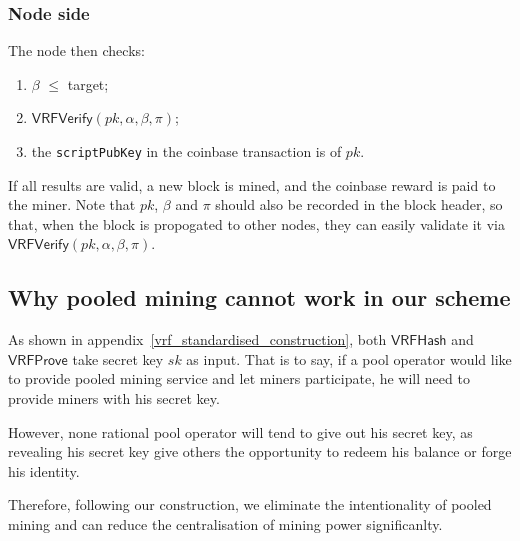 \subsubsection{Node side}

The node then checks:

\begin{enumerate}
    \item $\beta$ $\le$ target;
    \item $\mathsf{VRFVerify}(pk, \alpha, \beta, \pi)$;
    \item the \texttt{scriptPubKey} in the coinbase transaction is of $pk$.
\end{enumerate}

If all results are valid, a new block is mined, and the coinbase reward is paid to the miner. Note that $pk$, $\beta$ and $\pi$ should also be recorded in the block header, so that, when the block is propogated to other nodes, they can easily validate it via $\mathsf{VRFVerify}(pk, \alpha, \beta, \pi)$.



\subsection{Why pooled mining cannot work in our scheme}
\label{sec:discourage-pool}

As shown in appendix~\ref{vrf_standardised_construction}, both $\mathsf{VRFHash}$ and $\mathsf{VRFProve}$ take secret key $sk$ as input.
That is to say, if a pool operator would like to provide pooled mining service and let miners participate, he will need to provide miners with his secret key.

However, none rational pool operator will tend to give out his secret key, as revealing his secret key give others the opportunity to redeem his balance or forge his identity.

Therefore, following our construction, we eliminate the intentionality of pooled mining and can reduce the centralisation of mining power significanlty.
